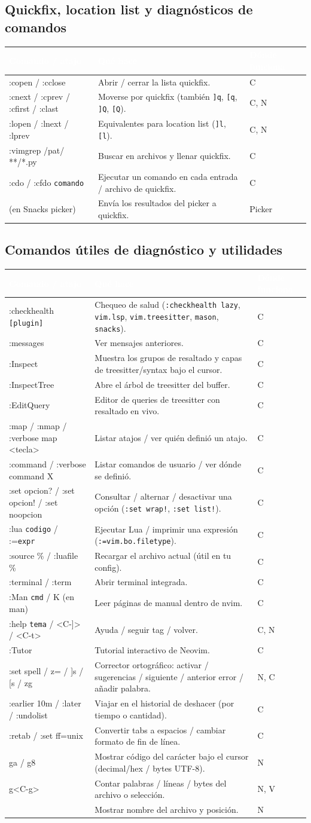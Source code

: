 \documentclass[8pt,a4paper,landscape]{extarticle}
\newcommand{\kk}[1]{\texttt{#1}}
\newenvironment{cht}{%
  \begin{longtable}{>{\raggedright\arraybackslash\ttfamily}p{0.27\textwidth}
                    >{\raggedright\arraybackslash}p{0.46\textwidth}
                    >{\raggedright\arraybackslash}p{0.21\textwidth}}
  \rowcolor{accent}\textcolor{white}{\textbf{\rmfamily Comando / atajo}} &
  \textcolor{white}{\textbf{Qué hace}} & \textcolor{white}{\textbf{Dónde funciona}} \\
  \endhead
}{\end{longtable}}
\newcommand{\rr}[3]{#1 & #2 & #3 \\}
\newcommand{\rg}[3]{\rowcolor{rowgray}\relax #1 & #2 & #3 \\}
\let\oldsubsection\subsection
\renewcommand{\subsection}{\Needspace{9\baselineskip}\oldsubsection}
\begin{document}
\subsection{Quickfix, location list y diagnósticos de comandos}
\begin{cht}
\rg{:copen / :cclose}{Abrir / cerrar la lista quickfix.}{C}
\rr{:cnext / :cprev / :cfirst / :clast}{Moverse por quickfix (también \kk{]q}, \kk{[q}, \kk{]Q}, \kk{[Q}).}{C, N}
\rg{:lopen / :lnext / :lprev}{Equivalentes para location list (\kk{]l}, \kk{[l}).}{C, N}
\rr{:vimgrep /pat/ **/*.py}{Buscar en archivos y llenar quickfix.}{C}
\rg{:cdo / :cfdo \kk{comando}}{Ejecutar un comando en cada entrada / archivo de quickfix.}{C}
\rr{<C-q> (en Snacks picker)}{Envía los resultados del picker a quickfix.}{Picker}
\end{cht}

\subsection{Comandos útiles de diagnóstico y utilidades}
\begin{cht}
\rg{:checkhealth \kk{[plugin]}}{Chequeo de salud (\kk{:checkhealth lazy}, \kk{vim.lsp}, \kk{vim.treesitter}, \kk{mason}, \kk{snacks}).}{C}
\rr{:messages}{Ver mensajes anteriores.}{C}
\rg{:Inspect}{Muestra los grupos de resaltado y capas de treesitter/syntax bajo el cursor.}{C}
\rr{:InspectTree}{Abre el árbol de treesitter del buffer.}{C}
\rg{:EditQuery}{Editor de queries de treesitter con resaltado en vivo.}{C}
\rr{:map / :nmap / :verbose map <tecla>}{Listar atajos / ver quién definió un atajo.}{C}
\rg{:command / :verbose command X}{Listar comandos de usuario / ver dónde se definió.}{C}
\rr{:set opcion? / :set opcion! / :set noopcion}{Consultar / alternar / desactivar una opción (\kk{:set wrap!}, \kk{:set list!}).}{C}
\rg{:lua \kk{codigo} / :=\kk{expr}}{Ejecutar Lua / imprimir una expresión (\kk{:=vim.bo.filetype}).}{C}
\rr{:source \% / :luafile \%}{Recargar el archivo actual (útil en tu config).}{C}
\rg{:terminal / :term}{Abrir terminal integrada.}{C}
\rr{:Man \kk{cmd} / K (en man)}{Leer páginas de manual dentro de nvim.}{C}
\rg{:help \kk{tema} / <C-]> / <C-t>}{Ayuda / seguir tag / volver.}{C, N}
\rr{:Tutor}{Tutorial interactivo de Neovim.}{C}
\rg{:set spell / z= / ]s / [s / zg}{Corrector ortográfico: activar / sugerencias / siguiente / anterior error / añadir palabra.}{N, C}
\rr{:earlier 10m / :later / :undolist}{Viajar en el historial de deshacer (por tiempo o cantidad).}{C}
\rg{:retab / :set ff=unix}{Convertir tabs a espacios / cambiar formato de fin de línea.}{C}
\rr{ga / g8}{Mostrar código del carácter bajo el cursor (decimal/hex / bytes UTF-8).}{N}
\rg{g<C-g>}{Contar palabras / líneas / bytes del archivo o selección.}{N, V}
\rr{<C-g>}{Mostrar nombre del archivo y posición.}{N}
\end{cht}
\end{document}

